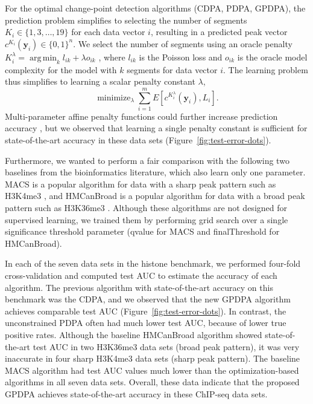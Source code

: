 \documentclass{article}
\DeclareMathOperator*{\argmin}{arg\,min}
\DeclareMathOperator*{\minimize}{minimize}
\begin{document}
For the optimal change-point detection algorithms (CDPA, PDPA, GPDPA),
the prediction problem simplifies to selecting the number of segments
$K_i\in \{1, 3,\dots, 19\}$ for each data vector $i$, resulting in a
predicted peak vector $c^{K_i}(\mathbf y_i)\in\{0,1\}^n$. We select the
number of segments using an oracle penalty
$K_i^\lambda=\argmin_k l_{ik} + \lambda o_{ik}$
\citep{cleynen2013segmentation}, where $l_{ik}$ is the Poisson loss and
$o_{ik}$ is the oracle model complexity for the model with $k$
segments for data vector $i$. 
The learning problem thus simplifies to learning a scalar
penalty constant $\lambda$,
\begin{equation}
  \label{eq:learn-lambda}
  \minimize_{\lambda}
  \sum_{i=1}^m E\left[
    c^{K_i^\lambda}(\mathbf y_i), 
    L_i\right].
\end{equation}
Multi-parameter affine penalty functions could further increase prediction
accuracy \citep{HOCKING-penalties}, but we observed that learning a
single penalty constant is sufficient for state-of-the-art accuracy in
these data sets (Figure~\ref{fig:test-error-dots}). 

Furthermore, we wanted to perform a fair comparison with the following
two baselines from the bioinformatics literature, which also learn
only one parameter.
MACS is a popular algorithm for data with a sharp peak pattern such as
H3K4me3 \citep{MACS}, and \mbox{HMCanBroad} is a popular algorithm for
data with a broad peak pattern such as H3K36me3 \citep{HMCan}. Although these
algorithms are not designed for supervised learning, we trained them
by performing grid search over a single significance threshold
parameter (qvalue for MACS and finalThreshold for HMCanBroad).

In each of the seven data sets in the histone 
benchmark,
we performed four-fold cross-validation and computed test AUC to
estimate the accuracy of each algorithm.  The previous algorithm with
state-of-the-art accuracy on this benchmark was the CDPA, and we
observed that the new GPDPA algorithm achieves comparable test AUC
(Figure~\ref{fig:test-error-dots}). In contrast, the unconstrained
PDPA often had much lower test AUC, because of lower true positive
rates. Although the baseline HMCanBroad algorithm showed
state-of-the-art test AUC in two H3K36me3 data sets (broad peak
pattern), it was very inaccurate in four sharp H3K4me3 data sets
(sharp peak pattern). The baseline MACS algorithm had test AUC values
much lower than the optimization-based algorithms in all seven data
sets. Overall, these data indicate that the proposed GPDPA achieves
state-of-the-art accuracy in these ChIP-seq data sets.
\end{document}
